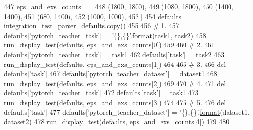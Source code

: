 \begin{DoxyCode}
447         eps\_and\_exs\_counts = [
448             (1800, 1800),
449             (1080, 1800),
450             (1400, 1400),
451             (680, 1400),
452             (1000, 1000),
453         ]
454         defaults = integration\_test\_parser\_defaults.copy()
455 
456         \textcolor{comment}{# 1.}
457         defaults[\textcolor{stringliteral}{'pytorch\_teacher\_task'}] = \textcolor{stringliteral}{'\{\},\{\}'}.\hyperlink{namespaceparlai_1_1chat__service_1_1services_1_1messenger_1_1shared__utils_a32e2e2022b824fbaf80c747160b52a76}{format}(task1, task2)
458         run\_display\_test(defaults, eps\_and\_exs\_counts[0])
459 
460         \textcolor{comment}{# 2.}
461         defaults[\textcolor{stringliteral}{'pytorch\_teacher\_task'}] = task1
462         defaults[\textcolor{stringliteral}{'task'}] = task2
463         run\_display\_test(defaults, eps\_and\_exs\_counts[1])
464 
465         \textcolor{comment}{# 3.}
466         del defaults[\textcolor{stringliteral}{'task'}]
467         defaults[\textcolor{stringliteral}{'pytorch\_teacher\_dataset'}] = dataset1
468         run\_display\_test(defaults, eps\_and\_exs\_counts[2])
469 
470         \textcolor{comment}{# 4.}
471         del defaults[\textcolor{stringliteral}{'pytorch\_teacher\_task'}]
472         defaults[\textcolor{stringliteral}{'task'}] = task1
473         run\_display\_test(defaults, eps\_and\_exs\_counts[3])
474 
475         \textcolor{comment}{# 5.}
476         del defaults[\textcolor{stringliteral}{'task'}]
477         defaults[\textcolor{stringliteral}{'pytorch\_teacher\_dataset'}] = \textcolor{stringliteral}{'\{\},\{\}'}.\hyperlink{namespaceparlai_1_1chat__service_1_1services_1_1messenger_1_1shared__utils_a32e2e2022b824fbaf80c747160b52a76}{format}(dataset1, dataset2)
478         run\_display\_test(defaults, eps\_and\_exs\_counts[4])
479 
480 
\end{DoxyCode}
\mbox{\label{classtests_1_1test__pytorch__data__teacher_1_1TestPytorchDataTeacher_ad9d9065300215a4afeb0589192b5ba05}} 
